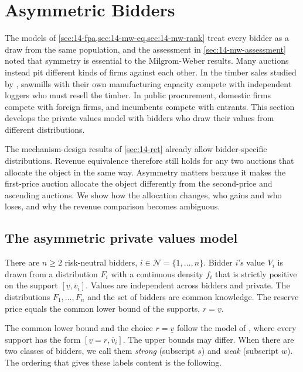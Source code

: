 \section{Asymmetric Bidders}\label{sec:14-asym}

The models of \cref{sec:14-fpa,sec:14-mw-eq,sec:14-mw-rank} treat every bidder as a draw from the same
population, and the assessment in \cref{sec:14-mw-assessment} noted that symmetry is essential to the
Milgrom-Weber results. Many auctions instead pit different kinds of firms against each other. In the timber sales studied by
\citet{AtheyLevinSeira2011}, sawmills with their own manufacturing capacity compete with independent
loggers who must resell the timber. In public procurement, domestic firms compete with foreign firms,
and incumbents compete with entrants. This section develops the private values model with bidders
who draw their values from different distributions.

The mechanism-design results of \cref{sec:14-ret} already allow bidder-specific distributions.
Revenue equivalence therefore still holds for any two auctions that allocate the object in the same
way. Asymmetry matters because it makes the first-price auction allocate the object differently from
the second-price and ascending auctions. We show how the allocation changes, who gains and who loses,
and why the revenue comparison becomes ambiguous.

\subsection{The asymmetric private values model}\label{sec:14-asym-model}

\begin{assumption}\label{ass:14-asym}
There are $n\ge 2$ risk-neutral bidders, $i\in\mathcal N=\{1,\dots,n\}$. Bidder $i$'s value $V_i$ is
drawn from a distribution $F_i$ with a continuous density $f_i$ that is strictly positive on the
support $[\underline v,\bar v_i]$. Values are independent across bidders and private. The
distributions $F_1,\dots,F_n$ and the set of bidders are common knowledge. The reserve price equals
the common lower bound of the supports, $r=\underline v$.
\end{assumption}

The common lower bound and the choice $r=\underline v$ follow the model of
\citet[Section II.A]{AtheyLevinSeira2011}, where every support has the form $[\underline v=r,\bar
v_i]$. The upper bounds may differ. When there are two classes of bidders, we call them
\emph{strong} (subscript $s$) and \emph{weak} (subscript $w$). The ordering that gives these labels
content is the following.

